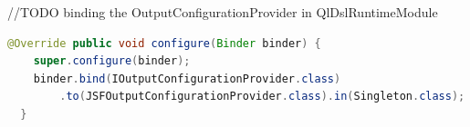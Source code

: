 //TODO binding the OutputConfigurationProvider in QlDslRuntimeModule 

\begin{lstlisting}[language=Java,
caption={Binding
JSFOutputConfigurationProvider},label={lst:bindingJsfOutputConfigurationProvider}]
@Override public void configure(Binder binder) {
    super.configure(binder);
    binder.bind(IOutputConfigurationProvider.class)
        .to(JSFOutputConfigurationProvider.class).in(Singleton.class);
  }
 \end{lstlisting}